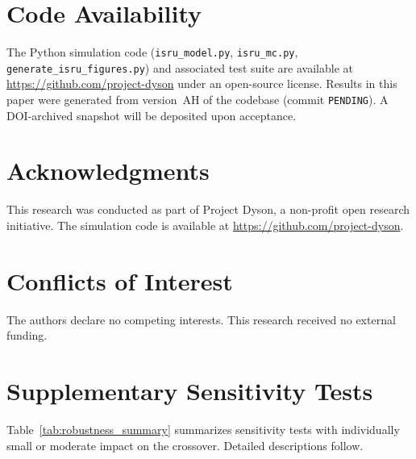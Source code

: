 \documentclass[preprint,12pt]{elsarticle}
\begin{document}
\section*{Code Availability}

The Python simulation code (\texttt{isru\_model.py}, \texttt{isru\_mc.py}, \texttt{generate\_isru\_figures.py}) and associated test suite are available at \url{https://github.com/project-dyson} under an open-source license. Results in this paper were generated from version~AH of the codebase (commit \texttt{PENDING}). A DOI-archived snapshot will be deposited upon acceptance.


\section*{Acknowledgments}

This research was conducted as part of Project Dyson, a non-profit open research initiative. The simulation code is available at \url{https://github.com/project-dyson}.

\section*{Conflicts of Interest}

The authors declare no competing interests. This research received no external funding.

\appendix
\section{Supplementary Sensitivity Tests}
\label{sec:appendix_sensitivity}

Table~\ref{tab:robustness_summary} summarizes sensitivity tests with individually small or moderate impact on the crossover. Detailed descriptions follow.
\end{document}
